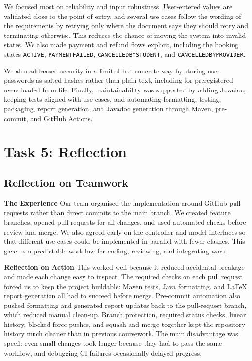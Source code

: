 \documentclass[11pt,a4paper]{article}
\begin{document}
We focused most on reliability and input robustness. User-entered values are validated
close to the point of entry, and several use cases follow the wording of the requirements
by retrying only where the document says they should retry and terminating otherwise.
This reduces the chance of moving the system into invalid states. We also made payment
and refund flows explicit, including the booking states \texttt{ACTIVE},
\texttt{PAYMENTFAILED}, \texttt{CANCELLEDBYSTUDENT}, and
\texttt{CANCELLEDBYPROVIDER}.

We also addressed security in a limited but concrete way by storing user passwords as
salted hashes rather than plain text, including for preregistered users loaded from file.
Finally, maintainability was supported by adding Javadoc, keeping tests aligned with use
cases, and automating formatting, testing, packaging, report generation, and Javadoc
generation through Maven, pre-commit, and GitHub Actions.

\newpage

\section{Task 5: Reflection}

\subsection{Reflection on Teamwork}

\noindent

\textbf{The Experience}
Our team organised the implementation around GitHub pull requests rather than direct commits to the main branch. We created feature branches, opened pull requests for all changes, and used automated checks before review and merge. We also agreed early on the controller and model interfaces so that different use cases could be implemented in parallel with fewer clashes. This gave us a predictable workflow for coding, reviewing, and integrating work.

\textbf{Reflection on Action}
This worked well because it reduced accidental breakage and made each change easy to inspect. The required checks on each pull request forced us to keep the project buildable: Maven tests, Java formatting, and LaTeX report generation all had to succeed before merge. Pre-commit automation also pushed formatting and generated report updates back to the pull-request branch, which reduced manual clean-up. Branch protection, required status checks, linear history, blocked force pushes, and squash-and-merge together kept the repository history much cleaner than in previous coursework. The main disadvantage was speed: even small changes took longer because they had to pass the same workflow, and debugging CI failures occasionally delayed progress.
\end{document}

